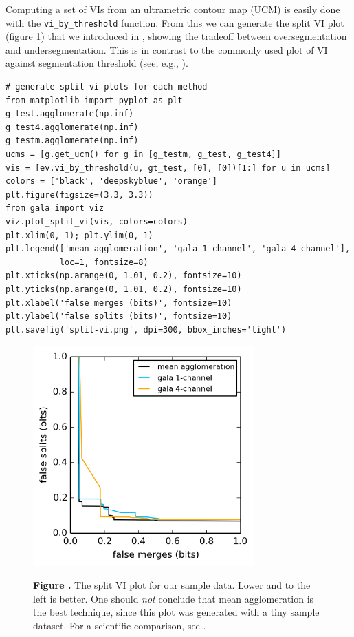 \documentclass{frontiersSCNS} %
\begin{document}
Computing a set of VIs from an ultrametric contour map (UCM) \citep{Arbelaez:jg} is easily done with the \texttt{\small vi\_by\_threshold} function.
From this we can generate the split VI plot (figure \ref{fig:02}) that we introduced in \cite{NunezIglesias:2013cd}, showing the tradeoff between oversegmentation and undersegmentation.
This is in contrast to the commonly used plot of VI against segmentation threshold (see, e.g., \cite{Andres:2012vp}).


{\small
\begin{verbatim}
# generate split-vi plots for each method
from matplotlib import pyplot as plt
g_test.agglomerate(np.inf)
g_test4.agglomerate(np.inf)
g_testm.agglomerate(np.inf)
ucms = [g.get_ucm() for g in [g_testm, g_test, g_test4]]
vis = [ev.vi_by_threshold(u, gt_test, [0], [0])[1:] for u in ucms]
colors = ['black', 'deepskyblue', 'orange']
plt.figure(figsize=(3.3, 3.3))
from gala import viz
viz.plot_split_vi(vis, colors=colors)
plt.xlim(0, 1); plt.ylim(0, 1)
plt.legend(['mean agglomeration', 'gala 1-channel', 'gala 4-channel'],
           loc=1, fontsize=8)
plt.xticks(np.arange(0, 1.01, 0.2), fontsize=10)
plt.yticks(np.arange(0, 1.01, 0.2), fontsize=10)
plt.xlabel('false merges (bits)', fontsize=10)
plt.ylabel('false splits (bits)', fontsize=10)
plt.savefig('split-vi.png', dpi=300, bbox_inches='tight')
\end{verbatim}
}

\begin{figure}
\begin{center}
\includegraphics[width=85mm]{figure2}
\end{center}
 \textbf{\label{fig:02} Figure .}{ The split VI plot for our sample data. Lower and to the left is better. One should \emph{not} conclude that mean agglomeration is the best technique, since this plot was generated with a tiny sample dataset. For a scientific comparison, see \cite{NunezIglesias:2013cd}. }
\end{figure}
\end{document}
